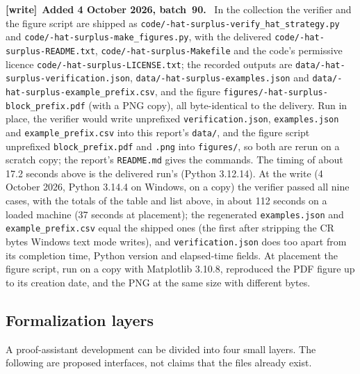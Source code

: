 \documentclass[11pt,letterpaper]{article}
\theoremstyle{definition}
\newenvironment{writenote}[1][]{\par\smallskip\begingroup\small
 \noindent\textbf{[write]}\if\relax\detokenize{#1}\relax\else~\textbf{#1.}\fi\ }%
 {\par\endgroup\smallskip}
\begin{document}
\begin{writenote}[Added 4 October 2026, batch~90]
In the collection the verifier and the figure script are shipped as \texttt{code/-hat-surplus-\allowbreak verify\_\allowbreak hat\_\allowbreak strategy.py} and \texttt{code/-hat-surplus-\allowbreak make\_\allowbreak figures.py}, with the delivered \texttt{code/-hat-surplus-\allowbreak README.txt}, \texttt{code/-hat-surplus-\allowbreak Makefile} and the code's permissive licence \texttt{code/-hat-surplus-\allowbreak LICENSE.txt}; the recorded outputs are \texttt{data/-hat-surplus-\allowbreak verification.json}, \texttt{data/-hat-surplus-\allowbreak examples.json} and \texttt{data/-hat-surplus-\allowbreak example\_\allowbreak prefix.csv}, and the figure \texttt{figures/-hat-surplus-\allowbreak block\_\allowbreak prefix.pdf} (with a PNG copy), all byte-identical to the delivery. Run in place, the verifier would write unprefixed \texttt{verification.json}, \texttt{examples.json} and \texttt{example\_\allowbreak prefix.csv} into this report's \texttt{data/}, and the figure script unprefixed \texttt{block\_\allowbreak prefix.pdf} and \texttt{.png} into \texttt{figures/}, so both are rerun on a scratch copy; the report's \texttt{README.md} gives the commands. The timing of about 17.2 seconds above is the delivered run's (Python 3.12.14). At the write (4 October 2026, Python 3.14.4 on Windows, on a copy) the verifier passed all nine cases, with the totals of the table and list above, in about 112 seconds on a loaded machine (37 seconds at placement); the regenerated \texttt{examples.json} and \texttt{example\_\allowbreak prefix.csv} equal the shipped ones (the first after stripping the CR bytes Windows text mode writes), and \texttt{verification.json} does too apart from its completion time, Python version and elapsed-time fields. At placement the figure script, run on a copy with Matplotlib 3.10.8, reproduced the PDF figure up to its creation date, and the PNG at the same size with different bytes.
\end{writenote}

\subsection{Formalization layers}

A proof-assistant development can be divided into four small layers.
The following are proposed interfaces, not claims that the files
already exist.
\end{document}
